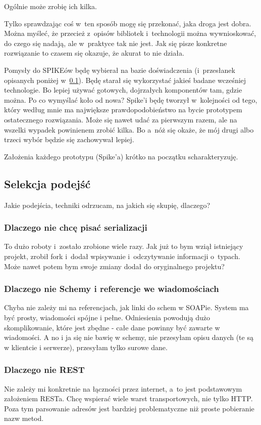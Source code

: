 Ogólnie może zrobię ich kilka.

Tylko sprawdzając coś w~ten sposób mogę się przekonać, jaka droga jest dobra. Można myśleć, że przecież z~opisów bibliotek i~technologii można wywnioskować, do czego się nadają, ale w~praktyce tak nie jest. Jak się pisze konkretne rozwiązanie to czasem się okazuje, że akurat to nie działa.

Pomysły do SPIKEów będę wybierał na bazie doświadczenia (i~przesłanek opisanych poniżej w~\ref{approach-selection}).
Będę starał się wykorzystać jakieś badane wcześniej technologie. Bo lepiej używać gotowych, dojrzałych komponentów tam, gdzie można. Po co wymyślać koło od nowa?
Spike'i będę tworzył w~kolejności od tego, który według mnie ma największe prawdopodobieństwo na bycie prototypem ostatecznego rozwiązania.
Może się nawet udać za pierwszym razem, ale na wszelki wypadek powinienem zrobić kilka. Bo a~nóż się okaże, że mój drugi albo trzeci wybór będzie się zachowywał lepiej.

Założenia każdego prototypu (Spike'a) krótko na początku scharakteryzuję.

\subsection{Selekcja podejść}
\label{approach-selection}
Jakie podejścia, techniki odrzucam, na jakich się skupię, dlaczego?

\subsubsection{Dlaczego nie chcę pisać serializacji}
To dużo roboty i~zostało zrobione wiele razy. Jak już to bym wziął istniejący projekt, zrobił fork i~dodał wpisywanie i~odczytywanie informacji o~typach. Może nawet potem bym swoje zmiany dodał do oryginalnego projektu?

\subsubsection{Dlaczego nie Schemy i referencje we wiadomościach}
Chyba nie zależy mi na referencjach, jak linki do schem w SOAPie. System ma być prosty, wiadomości spójne i pełne. Odniesienia powodują dużo skomplikowanie, które jest zbędne - całe dane powinny być zawarte w wiadomości. A no i ja się nie bawię w schemy, nie przesyłam opisu danych (te są w klientcie i serwerze), przesyłam tylko surowe dane.

\subsubsection{Dlaczego nie REST}
Nie zależy mi konkretnie na łączności przez internet, a~to jest podstawowym założeniem RESTa.
Chcę wspierać wiele warst transportowych, nie tylko HTTP. Poza tym parsowanie adresów jest bardziej problematyczne niż proste pobieranie nazw metod.

